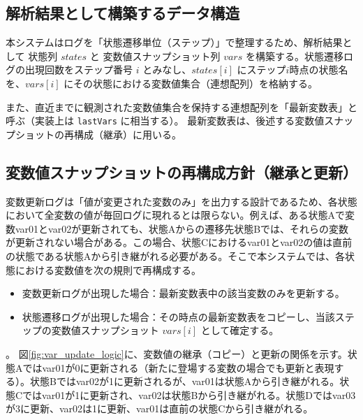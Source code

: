 \documentclass[12pt]{jreport}
\begin{document}
\subsection{解析結果として構築するデータ構造}
\begin{par}
本システムはログを「状態遷移単位（ステップ）」で整理するため、解析結果として 状態列 $states$ と 変数値スナップショット列 $vars$ を構築する。状態遷移ログの出現回数をステップ番号 $i$ とみなし、$states[i]$ にステップ$i$時点の状態名を、$vars[i]$ にその状態における変数値集合（連想配列）を格納する。
\end{par}

\begin{par}
また、直近までに観測された変数値集合を保持する連想配列を「最新変数表」と呼ぶ（実装上は \texttt{lastVars} に相当する）。
最新変数表は、後述する変数値スナップショットの再構成（継承）に用いる。
\end{par}

\subsection{変数値スナップショットの再構成方針（継承と更新）}
\begin{par}
変数更新ログは「値が変更された変数のみ」を出力する設計であるため、各状態において全変数の値が毎回ログに現れるとは限らない。例えば、ある状態Aで変数var01とvar02が更新されても、状態Aからの遷移先状態Bでは、それらの変数が更新されない場合がある。この場合、状態Cにおけるvar01とvar02の値は直前の状態である状態Aから引き継がれる必要がある。そこで本システムでは、各状態における変数値を次の規則で再構成する。
\end{par}
\begin{itemize}
  \item 変数更新ログが出現した場合：最新変数表中の該当変数のみを更新する。
  \item 状態遷移ログが出現した場合：その時点の最新変数表をコピーし、当該ステップの変数値スナップショット $vars[i]$ として確定する。
\end{itemize}

\begin{par}。
図\ref{fig:var_update_logic}に、変数値の継承（コピー）と更新の関係を示す。状態Aではvar01が0に更新される（新たに登場する変数の場合でも$更新$と表現する）。状態Bではvar02が1に更新されるが、var01は状態Aから引き継がれる。状態Cではvar01が1に更新され、var02は状態Bから引き継がれる。状態Dではvar03が3に更新、var02は1に更新、var01は直前の状態Cから引き継がれる。
\end{par}
\end{document}
